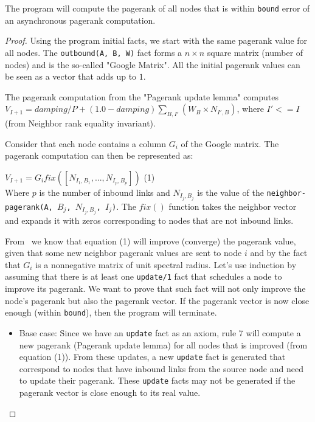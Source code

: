 \begin{theorem}
The program will compute the pagerank of all nodes that is within \texttt{bound} error
of an asynchronous pagerank computation.
\end{theorem}
\begin{proof}

Using the program initial facts, we start with the same pagerank value for all nodes.
The \texttt{\bang outbound(A, B, W)} fact forms a $n \times n$ square matrix (number
of nodes) and is the so-called "Google Matrix".  All the initial pagerank values
can be seen as a vector that adds up to $1$.

The pagerank computation from the "Pagerank update lemma" computes $V_{I + 1} =
damping / P + (1.0 - damping)\sum_{B, I'} (W_{B} \times N_{I',B})$, where $I' <=
I$
(from Neighbor rank equality invariant).

Consider that each node contains a column $G_i$ of the Google matrix. The
pagerank computation can then be represented as: \newline


$V_{I + 1} = G_i fix([N_{I_1, B_1}, ..., N_{I_p, B_p}])$ \hfill (1) \\


Where $p$ is the number of inbound links and $N_{I_j, B_j}$ is the value of
the \texttt{neighbor-pagerank(A, $B_j$, $N_{I_j, B_j}$, $I_j$)}. The $fix()$
function takes the neighbor vector and expands it with zeros corresponding to
nodes that are not inbound links.

From~\cite{DBLP:journals/corr/abs-cs-0606047, Lubachevsky:1986:CAA:4904.4801} we
know that equation (1) will improve (converge) the pagerank value, given that some new
neighbor pagerank values are sent to node $i$ and by the fact that $G_i$ is a
nonnegative matrix of unit spectral radius. Let's use induction by assuming that there
is at least one \texttt{update/1} fact that
schedules a node to improve its pagerank. We want to prove that such fact will
not only improve the node's pagerank but also the pagerank vector.
If the pagerank vector is now close enough (within \texttt{bound}), then the
program will terminate.

\begin{itemize}
   \item Base case: Since we have an \texttt{update} fact as an axiom, rule 7
   will compute a new pagerank (Pagerank update lemma) for all nodes that is
   improved (from equation (1)). From these updates, a new \texttt{update}
   fact is generated that correspond to nodes that have inbound links from the
   source node and need to update their pagerank. These \texttt{update} facts
   may not be generated if the pagerank vector is close enough to its real
   value.


\end{itemize}
\end{proof}
